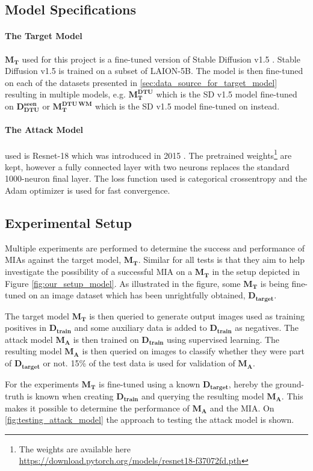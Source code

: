 \subsection{Model Specifications}
\paragraph{The Target Model} 
$\mathbf{M_T}$ used for this project is a fine-tuned version of Stable Diffusion v1.5 \cite{rombach2022highresolution}. Stable Diffusion v1.5 is trained on a subset of LAION-5B. The model is then fine-tuned on each of the datasets presented in \cref{sec:data_source_for_target_model} resulting in multiple models, e.g. $\mathbf{M_T^{DTU}}$ which is the SD v1.5 model fine-tuned on $\mathbf{D_{DTU}^{seen}}$ or $\mathbf{M_T^{DTU \ WM}}$ which is the SD v1.5 model fine-tuned on \wmseen instead.

\paragraph{The Attack Model} 
used is Resnet-18 which was introduced in 2015 \cite{DBLP:journals/corr/HeZRS15}. The pretrained weights\footnote{The weights are available here \url{https://download.pytorch.org/models/resnet18-f37072fd.pth}} are kept, however a fully connected layer with two neurons replaces the standard 1000-neuron final layer. The loss function used is ca\-te\-go\-ri\-cal cross\-en\-tro\-py and the Adam optimizer is used for fast con\-ver\-gen\-ce.

\subsection{Experimental Setup} \label{sec:Test_Setup}
Multiple experiments are performed to determine the success and performance of MIAs against the target model, $\mathbf{M_T}$. Similar for all tests is that they aim to help investigate the possibility of a successful MIA on a $\mathbf{M_T}$ in the setup depicted in Figure \ref{fig:our_setup_model}. As illustrated in the figure, some $\mathbf{M_T}$ is being fine-tuned on an image dataset which has been unrightfully obtained, $\mathbf{D_{target}}$.



The target model $\mathbf{M_T}$ is then queried to generate output images used as training positives in $\mathbf{D_{train}}$ and some auxiliary data is added to $\mathbf{D_{train}}$ as negatives. The attack model $\mathbf{M_A}$ is then trained on $\mathbf{D_{train}}$ using supervised learning. The resulting model $\mathbf{M_A}$ is then queried on images to classify whether they were part of $\mathbf{D_{target}}$ or not. 15\% of the test data is used for validation of $\mathbf{M_A}$. 

For the experiments  $\mathbf{M_T}$ is fine-tuned using a known $\mathbf{D_{target}}$, hereby the ground-truth is known when creating $\mathbf{D_{train}}$ and querying the resulting model $\mathbf{M_A}$. This makes it possible to determine the performance of $\mathbf{M_A}$ and the MIA. On \cref{fig:testing_attack_model} the approach to testing the attack model is shown. 



